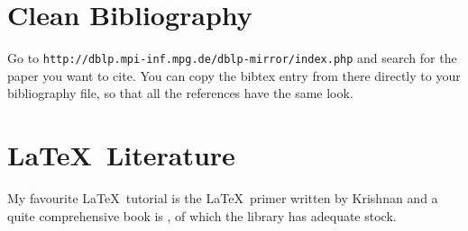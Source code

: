 \begin{figure}[htb]
	\centering
\end{figure}

\section{Clean Bibliography}
Go to \verb'http://dblp.mpi-inf.mpg.de/dblp-mirror/index.php' and search for the paper you want to cite. 
You can copy the bibtex entry from there directly to your bibliography file, so that all the references have the same look. 
%
%
%
\section{\LaTeX\ Literature}
My favourite \LaTeX\ tutorial is the \LaTeX\ primer written by Krishnan \cite{Kr03} and a quite comprehensive book is \cite{Ko03}, of which the library has adequate stock.  


